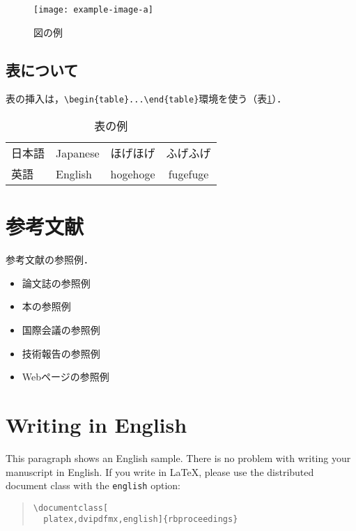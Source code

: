 \documentclass[platex,dvipdfmx]{rbproceedings}
\newcommand{\code}[1]{\texttt{#1}}
\begin{document}
\begin{figure}[t]
\centering
\texttt{[image: example-image-a]}
\caption{図の例}
\label{fig:sample}
\end{figure}

\subsection{表について}
表の挿入は，\verb|\begin{table}...\end{table}|環境を使う（表\ref{tab:sample}）．

\begin{table}[t]
\centering
\caption{表の例}
\label{tab:sample}
\begin{tabular}{llcc}
\hline
日本語 & Japanese & ほげほげ & ふげふげ \\
英語 & English & hogehoge & fugefuge \\
\hline
\end{tabular}
\end{table}

\section{参考文献}
参考文献の参照例．
\begin{itemize}
\item 論文誌の参照例 \cite{Article_01}
\item 本の参照例 \cite{Book_02}
\item 国際会議の参照例 \cite{Inproc_03}
\item 技術報告の参照例 \cite{Techrep_05}
\item Webページの参照例 \cite{Web_06}
\end{itemize}

\section{Writing in English}
This paragraph shows an English sample.
There is no problem with writing your manuscript in English.
If you write in LaTeX, please use the distributed document class with the \code{english} option:
\begin{quote}
\verb|\documentclass[|\\
\verb|  platex,dvipdfmx,english]{rbproceedings}|
\end{quote}



\end{document}
